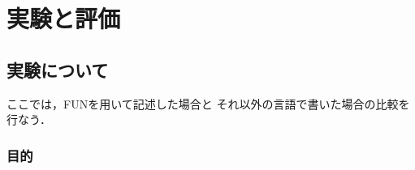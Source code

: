 \documentclass{funthesis}
\begin{document}

\chapter{実験と評価}

\section{実験について}

ここでは，FUNを用いて記述した場合と
それ以外の言語で書いた場合の比較を行なう．





\subsection{目的}



\end{document}
